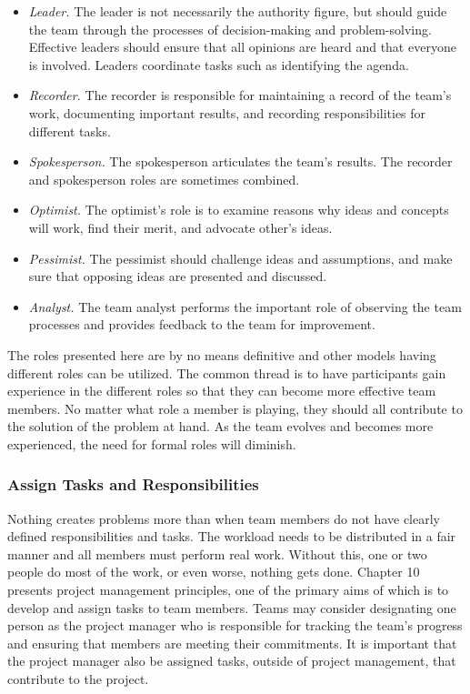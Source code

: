 \begin{itemize}
\item
  \emph{Leader.} The leader is not necessarily the authority figure, but
  should guide the team through the processes of decision-making and
  problem-solving. Effective leaders should ensure that all opinions are
  heard and that everyone is involved. Leaders coordinate tasks such as
  identifying the agenda.
\item
  \emph{Recorder.} The recorder is responsible for maintaining a record
  of the team's work, documenting important results, and recording
  responsibilities for different tasks.
\item
  \emph{Spokesperson.} The spokesperson articulates the team's results.
  The recorder and spokesperson roles are sometimes combined.
\item
  \emph{Optimist.} The optimist's role is to examine reasons why ideas
  and concepts will work, find their merit, and advocate other's ideas.
\item
  \emph{Pessimist.} The pessimist should challenge ideas and
  assumptions, and make sure that opposing ideas are presented and
  discussed.
\item
  \emph{Analyst.} The team analyst performs the important role of
  observing the team processes and provides feedback to the team for
  improvement.
\end{itemize}

The roles presented here are by no means definitive and other models
having different roles can be utilized. The common thread is to have
participants gain experience in the different roles so that they can
become more effective team members. No matter what role a member is
playing, they should all contribute to the solution of the problem at
hand. As the team evolves and becomes more experienced, the need for
formal roles will diminish.

\subsubsection{Assign Tasks and
Responsibilities}\label{assign-tasks-and-responsibilities}

Nothing creates problems more than when team members do not have clearly
defined responsibilities and tasks. The workload needs to be distributed
in a fair manner and all members must perform real work. Without this,
one or two people do most of the work, or even worse, nothing gets done.
Chapter 10 presents project management principles, one of the primary
aims of which is to develop and assign tasks to team members. Teams may
consider designating one person as the project manager who is
responsible for tracking the team's progress and ensuring that members
are meeting their commitments. It is important that the project manager
also be assigned tasks, outside of project management, that contribute
to the project.

